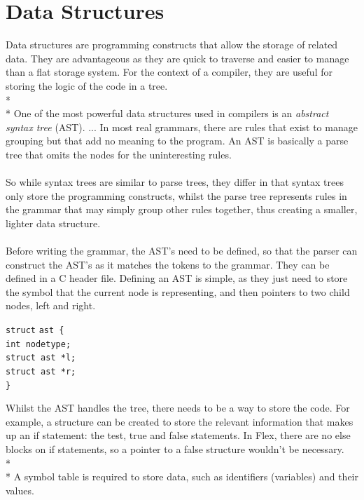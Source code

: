 \documentclass[12pt]{report}
\begin{document}
\section{Data Structures}
Data structures are programming constructs that allow the storage of related data.  They are advantageous as they are quick to traverse and easier to manage than a flat storage system.  For the context of a compiler, they are useful for storing the logic of the code in a tree.\\*
\\*
One of the most powerful data structures used in compilers is an \textit{abstract syntax tree} (AST). ... In most real grammars, there are rules that exist to manage grouping but that add no meaning to the program.  An AST is basically a parse tree that omits the nodes for the uninteresting rules. \citep{flexandbison09}\\
\\
So while syntax trees are similar to parse trees, they differ in that syntax trees only store the programming constructs, whilst the parse tree represents rules in the grammar that may simply group other rules together, thus creating a smaller, lighter data structure.\\
\\
Before writing the grammar, the AST's need to be defined, so that the parser can construct the AST's as it matches the tokens to the grammar.  They can be defined in a C header file.  Defining an AST is simple, as they just need to store the symbol that the current node is representing, and then pointers to two child nodes, left and right.\\
\begin{tabbing}
	\texttt{struct} \= \texttt{ast \{}\\
	\> \texttt{int nodetype;}\\
	\> \texttt{struct ast *l;}\\
	\> \texttt{struct ast *r;}\\
	\texttt{\}}
\end{tabbing}
Whilst the AST handles the tree, there needs to be a way to store the code.  For example, a structure can be created to store the relevant information that makes up an if statement: the test, true and false statements.  In Flex, there are no else blocks on if statements, so a pointer to a false structure wouldn't be necessary.\\*
\\*
A symbol table is required to store data, such as identifiers (variables) and their values.
\end{document}

